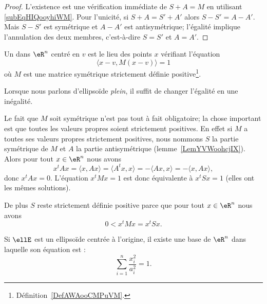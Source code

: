 \begin{proof}
	L'existence est une vérification immédiate de \( S+A=M\) en utilisant \eqref{subEqHIQooyhiWM}. Pour l'unicité, si \( S+A=S'+A'\) alors \( S-S'=A-A'\). Mais \( S-S'\) est symétrique et \( A-A'\) est antisymétrique; l'égalité implique l'annulation des deux membres, c'est-à-dire \( S=S'\) et \( A=A'\).
\end{proof}

\begin{definition}  \label{DefOEPooqfXsE}
	Un  dans \( \eR^n\) centré en \( v\) est le lieu des points \( x\) vérifiant l'équation
	\begin{equation}\label{EqSNWooXfbTH}
		\langle x-v, M(x-v)\rangle =1
	\end{equation}
	où \( M\) est une matrice symétrique strictement définie positive\footnote{Définition~\ref{DefAWAooCMPuVM}.}.

	Lorsque nous parlons d'ellipsoïde \emph{plein}, il suffit de changer l'égalité en une inégalité.
\end{definition}

\begin{remark}
	Le fait que \( M\) soit symétrique n'est pas tout à fait obligatoire; la chose important est que toutes les valeurs propres soient strictement positives. En effet si \( M\) a toutes ses valeurs propres strictement positives, nous nommons \( S\) la partie symétrique de \( M\) et \( A\) la partie antisymétrique (lemme~\ref{LemYVWoohcjIX}). Alors pour tout \( x\in \eR^n\) nous avons
	\begin{equation}
		x^tAx=\langle x, Ax\rangle =\langle A^tx,x \rangle =-\langle Ax, x\rangle =-\langle x,Ax\rangle ,
	\end{equation}
	donc \( x^tAx=0\). L'équation \( x^tMx=1\) est donc équivalente à \( x^tSx=1\) (elles ont les mêmes solutions).

	De plus \( S\) reste strictement définie positive parce que pour tout \( x\in \eR^n\) nous avons
	\begin{equation}
		0<x^tMx=x^tSx.
	\end{equation}
\end{remark}

\begin{proposition}\label{PropWDRooQdJiIr}
	Si \( \ellE\) est un ellipsoïde centrée à l'origine, il existe une base de \( \eR^n\) dans laquelle son équation est :
	\begin{equation}
		\sum_{i=1}^n\frac{ x_i^2 }{ a_i^2 }=1.
	\end{equation}
\end{proposition}

